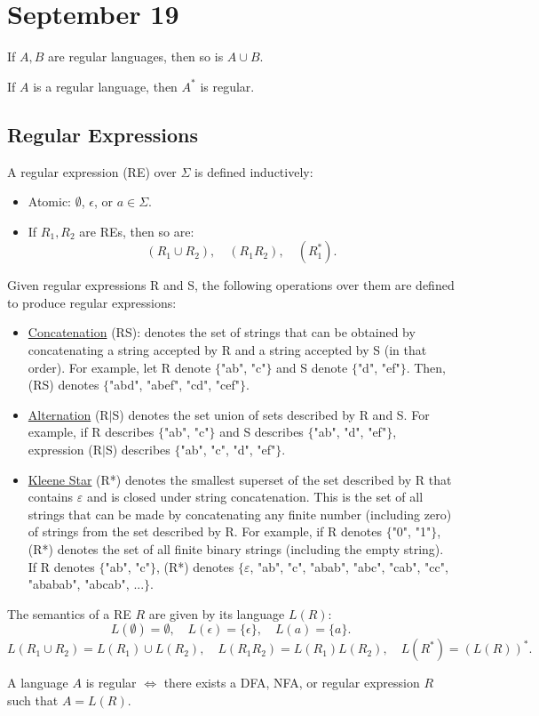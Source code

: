 \section{September 19}

\begin{theorem}
If $A, B$ are regular languages, then so is $A \cup B$.
\end{theorem}

\begin{theorem}
If $A$ is a regular language, then $A^*$ is regular.
\end{theorem}

\subsection*{Regular Expressions}
\begin{definition} \label{def:regex}
A regular expression (RE) over $\Sigma$ is defined inductively:
\begin{itemize}
    \item Atomic: $\emptyset$, $\epsilon$, or $a \in \Sigma$.
    \item If $R_1, R_2$ are REs, then so are:
    \[
    (R_1 \cup R_2), \quad (R_1 R_2), \quad (R_1^*).
    \]
\end{itemize}
\end{definition}
Given regular expressions R and S, the following operations over them are defined to produce regular expressions:
\begin{itemize}
    \item \underline{Concatenation} (RS): denotes the set of strings that can be obtained by concatenating a string accepted by R and a string accepted by S (in that order). For example, let R denote $\{$"ab", "c"$\}$ and S denote $\{$"d", "ef"$\}$. Then, (RS) denotes $\{$"abd", "abef", "cd", "cef"$\}$.

    \item \underline{Alternation} (R$\vert$S) denotes the set union of sets described by R and S. For example, if R describes $\{$"ab", "c"$\}$ and S describes $\{$"ab", "d", "ef"$\}$, expression (R$\vert$S) describes $\{$"ab", "c", "d", "ef"$\}$.

    \item \underline{Kleene Star} (R*) denotes the smallest superset of the set described by R that contains $\varepsilon$ and is closed under string concatenation. This is the set of all strings that can be made by concatenating any finite number (including zero) of strings from the set described by R. For example, if R denotes $\{$"0", "1"$\}$, (R*) denotes the set of all finite binary strings (including the empty string). If R denotes $\{$"ab", "c"$\}$, (R*) denotes $\{ \varepsilon$, "ab", "c", "abab", "abc", "cab", "cc", "ababab", "abcab", ...$\}$.
\end{itemize}
\begin{definition}
The semantics of a RE $R$ are given by its language $L(R)$:
\[
L(\emptyset) = \emptyset, \quad L(\epsilon) = \{\epsilon\}, \quad L(a) = \{a\}.
\]
\[
L(R_1 \cup R_2) = L(R_1) \cup L(R_2), \quad L(R_1R_2) = L(R_1)L(R_2), \quad L(R^*) = (L(R))^*.
\]
\end{definition}

\begin{theorem}
A language $A$ is regular $\iff$ there exists a DFA, NFA, or regular expression $R$ such that $A = L(R)$.
\end{theorem}
